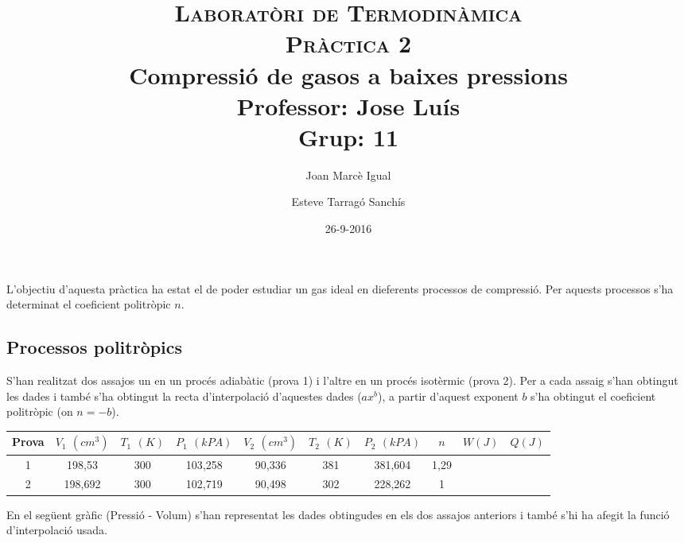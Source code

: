 \documentclass[a4paper]{article}
\title{\textsc{Laboratòri de Termodinàmica} \\ \textsc{Pràctica 2} \\ Compressió de gasos a baixes pressions \\
    \large
    Professor: Jose Luís \\ Grup: 11 }
\author{Joan Marcè Igual \and Esteve Tarragó Sanchís}
\date{26-9-2016}
\begin{document}
\maketitle

L'objectiu d'aquesta pràctica ha estat el de poder estudiar un gas ideal en dieferents processos de compressió. Per aquests processos s'ha determinat el coeficient politròpic $n$. 


\subsection*{Processos politròpics}

S'han realitzat dos assajos un en un procés adiabàtic (prova 1) i l'altre en un procés isotèrmic (prova 2). Per a cada assaig s'han obtingut les dades i també s'ha obtingut la recta d'interpolació d'aquestes dades ($ax^b$), a partir d'aquest exponent $b$ s'ha obtingut el coeficient politròpic (on $n = -b$).

\begin{tabular}{c|ccccccccc}
    Prova & $V_1$ $(cm^3)$ & $T_1$ $(K)$ & $P_1$ $(kPA)$ & $V_2$ $(cm^3)$ & $T_2$ $(K)$ & $P_2$ $(kPA)$ & $n$ & $W(J)$ & $Q(J)$ \\
    \hline
    1 & 198,53 & 300 & 103,258 & 90,336 & 381 & 381,604 & 1,29 & & \\
    2 & 198,692 & 300 & 102,719 & 90,498 & 302 & 228,262 & 1 & &  
\end{tabular}

En el següent gràfic (Pressió - Volum) s'han representat les dades obtingudes en els dos assajos anteriors i també s'hi ha afegit la funció d'interpolació usada.

\begin{center}
\end{center}
\end{document}
